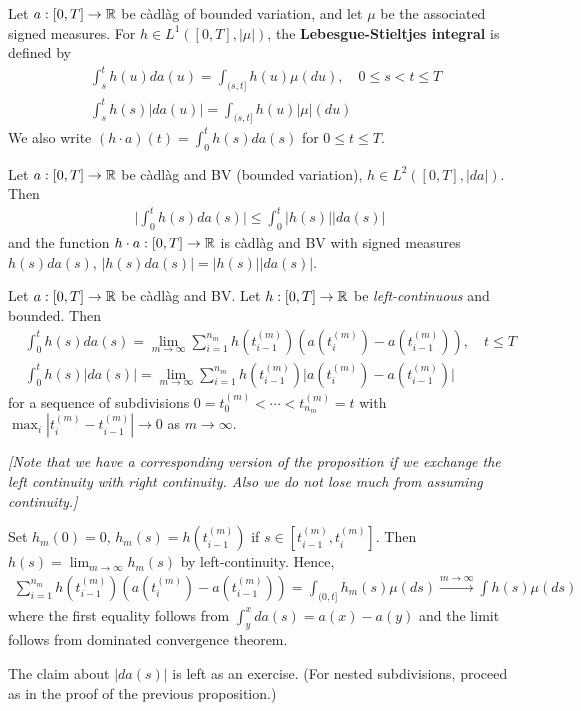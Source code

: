 \documentclass[12pt,a4paper]{article}
\newenvironment{proof}
{\begin{changemargin}{0.5cm}{0.5cm} 
	}%
	{\end{changemargin}
}
\newenvironment{p}
{\begin{proof} 
	}%
	{\end{proof}
}
\begin{document}
 Let $a:[0,T]\rightarrow \mathbb{R}$ be c\`adl\`ag of bounded variation, and let $\mu$ be the associated signed measures. For $h\in L^1([0,T], |\mu|)$, the \textbf{Lebesgue-Stieltjes integral} is defined by
\begin{align*}
& \int_s^t h(u) da(u) = \int_{(s,t]} h(u) \mu(du), \quad 0\leq s<t\leq T\\
& \int_s^t h(s) |da(u)| = \int_{(s,t]} h(u) |\mu| (du)
\end{align*}
We also write $(h\cdot a)(t) = \int_0^t h(s) da(s)$ for $0\leq t\leq T$.
\s

\fact Let $a: [0,T] \rightarrow \mathbb{R}$ be c\`adl\`ag and BV (bounded variation), $h\in L^2([0,T], |da|)$. Then
\begin{align*}
\Big| \int_0^t h(s) da(s )\Big| \leq \int_0^t |h(s)| |da(s)|
\end{align*}
and the function $h\cdot a:[0,T]\rightarrow \mathbb{R}$ is c\`adl\`ag and BV with signed measures $h(s)da(s)$, $|h(s)da(s)| = |h(s)||da(s)|$.
\s

\prop Let $a: [0,T] \rightarrow \mathbb{R}$ be c\`adl\`ag and BV. Let $h:[0,T] \rightarrow \mathbb{R}$ be \emph{left-continuous} and bounded. Then
\begin{align*}
& \int_0^t h(s) da(s) = \lim_{m\rightarrow \infty} \sum_{i=1}^{n_m} h(t_{i-1}^{(m)})(a(t_i^{(m)}) - a(t_{i-1}^{(m)})), \quad t\leq T \\
& \int_0^t h(s) |da(s)| = \lim_{m\rightarrow \infty} \sum_{i=1}^{n_m} h(t_{i-1}^{(m)})\Big|a(t_i^{(m)}) - a(t_{i-1}^{(m)})\Big|
\end{align*}
for a sequence of subdivisions $0=t_0^{(m)} < \cdots < t_{n_m}^{(m)}=t$ with $\max_i |t_i^{(m)} - t_{i-1}^{(m)}| \rightarrow 0$ as $m\rightarrow \infty$.

\quad \emph{[Note that we have a corresponding version of the proposition if we exchange the left continuity with right continuity. Also we do not lose much from assuming continuity.]}
\begin{p}
\pf Set $h_m(0)=0$, $h_m(s) = h(t_{i-1}^{(m)})$ if $s\in [t_{i-1}^{(m)}, t_i^{(m)}]$. Then $h(s) = \lim_{m\rightarrow \infty} h_m(s)$ by left-continuity. Hence, 
\begin{align*}
\sum_{i=1}^{n_m} h(t_{i-1}^{(m)})(a(t_i^{(m)}) - a(t_{i-1}^{(m)})) = \int_{(0,t]} h_m(s) \mu(ds) \xrightarrow{m\rightarrow \infty} \int h(s) \mu(ds)
\end{align*}
where the first equality follows from $\int_y^x da(s) = a(x)-a(y)$ and the limit follows from dominated convergence theorem.

\quad The claim about $|da(s)|$ is left as an exercise. (For nested subdivisions, proceed as in the proof of the previous proposition.)
\end{p}
\s
\end{document}
